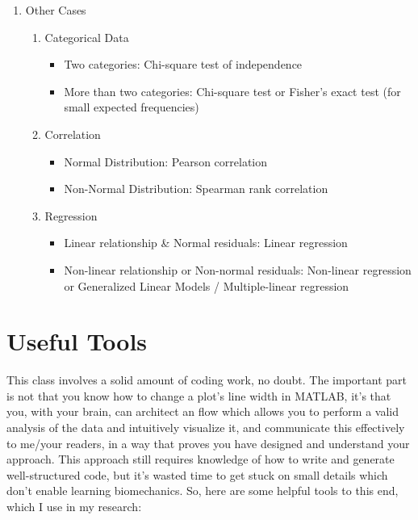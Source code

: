 \documentclass{article}
\begin{document}
\begin{enumerate}
    \item Other Cases
    \begin{enumerate}
        \item Categorical Data
        \begin{itemize}
            \item Two categories: Chi-square test of independence
            \item More than two categories: Chi-square test or Fisher's exact test (for small expected frequencies)
        \end{itemize}
        \item Correlation
        \begin{itemize}
            \item Normal Distribution: Pearson correlation
            \item Non-Normal Distribution: Spearman rank correlation
        \end{itemize}
        \item Regression
        \begin{itemize}
            \item Linear relationship \& Normal residuals: Linear regression
            \item Non-linear relationship or Non-normal residuals: Non-linear regression or Generalized Linear Models / Multiple-linear regression
        \end{itemize}
    \end{enumerate}
\end{enumerate}


\section {Useful Tools}
This class involves a solid amount of coding work, no doubt. The important part is not that you know how to change a plot's line width in MATLAB, it's that you, with your brain, can architect an flow which allows you to perform a valid analysis of the data and intuitively visualize it, and communicate this effectively to me/your readers, in a way that proves you have designed and understand your approach. This approach still requires knowledge of how to write and generate well-structured code, but it's wasted time to get stuck on small details which don't enable learning biomechanics. So, here are some helpful tools to this end, which I use in my research:
\end{document}
